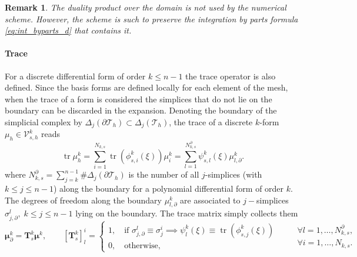 \documentclass{elsarticle}
\newcommand{\revTwo}[1]{{\color{black}#1}}
\newtheorem{remark}{Remark}
\DeclareMathOperator{\tr}{tr}
\begin{document}
\revTwo{
\begin{remark}
The duality product over the domain is not used by the numerical scheme. However, the scheme is such to preserve the integration by parts formula \eqref{eq:int_byparts_d} that contains it.
\end{remark}}

\paragraph{Trace}
For a discrete differential form of order $k \le n-1$ the trace operator is also defined. Since the basis forms are defined locally for each element of the mesh, when the trace of a form is considered the simplices that do not lie on the boundary can be discarded in the expansion. Denoting the boundary of the simplicial complex by
$\Delta_j(\partial \mathcal{T}_h) \subset \Delta_j(\mathcal{T}_h)$, the trace of a discrete $k$-form $\mu_h \in \mathcal{V}_{s, h}^k$ reads
\begin{equation}
    \tr \mu_h^k = \sum_{i=1}^{N_{k, s}} \tr(\phi_{s, i}^{k}(\xi)) \mu_i^k = \sum_{l=1}^{N_{k, s}^\partial} \psi_{s, l}^{k}(\xi) \mu_{l, \partial}^k.
\end{equation}
where $N_{k, s}^\partial = \sum_{j=k}^{n-1}\# \Delta_j(\partial \mathcal{T}_h)$ is the number of all $j$-simplices (with $k\le j\le n-1$) along the boundary for a polynomial differential form of order $k$. The degrees of freedom along the boundary $\mu_{l, \partial}^k$ are associated to $j-$simplices $\sigma_{j, \partial}^l, \; k\le j\le n-1$ lying on the boundary. The trace matrix simply collects them
\begin{equation}\label{eq:alg_trace}
    \bm{\mu}_\partial^k = \mathbf{T}^k_s \bm{\mu}^k, \qquad 
    [\mathbf{T}^k_s]_{l}^i = 
\begin{cases}
    1, \quad \text{if } \sigma_{j, \partial}^l \equiv \sigma_{j}^i \implies \psi_l^{k}(\xi) \equiv \tr(\phi_{s, j}^{k}(\xi))\\
    0, \quad \text{otherwise},
\end{cases} \qquad 
\begin{aligned}
    \forall l = 1, \dots, N_{k, s}^\partial, \\
    \forall i = 1, \dots, N_{k, s}.
\end{aligned}  
\end{equation}
\end{document}
